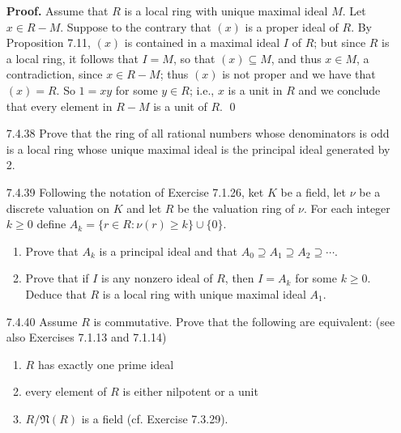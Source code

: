 \begin{enumerate}
      \textbf{Proof.} Assume that $R$ is a local ring with unique maximal ideal
      $M$. Let $x \in R - M$. Suppose to the contrary that $(x)$ is a proper
      ideal of $R$. By Proposition 7.11, $(x)$ is contained in a maximal ideal
      $I$ of $R$; but since $R$ is a local ring, it follows that $I = M$, so
      that $(x) \subseteq M$, and thus $x \in M$, a contradiction, since
      $x \in R - M$; thus $(x)$ is not proper and we have that $(x) = R$. So
      $1 = xy$ for some $y \in R$; i.e., $x$ is a unit in $R$ and we conclude
      that every element in $R - M$ is a unit of $R$. \qed
   \item[7.4.38]  Prove that the ring of all rational numbers whose denominators
                  is odd is a local ring whose unique maximal ideal is the
                  principal ideal generated by 2.
   \item[7.4.39]  Following the notation of Exercise 7.1.26, ket $K$ be a field,
                  let $\nu$ be a discrete valuation on $K$ and let $R$ be the
                  valuation ring of $\nu$. For each integer $k \ge 0$ define
                  $A_k = \{r \in R : \nu(r) \ge k\} \cup \{0\}$.
                  \begin{enumerate}
                     \item Prove that $A_k$ is a principal ideal and that
                           $A_0 \supseteq A_1 \supseteq A_2 \supseteq \cdots$.
                     \item Prove that if $I$ is any nonzero ideal of $R$, then
                           $I = A_k$ for some $k \ge 0$. Deduce that $R$ is a
                           local ring with unique maximal ideal $A_1$.
                  \end{enumerate}
   \item[7.4.40]  Assume $R$ is commutative. Prove that the following are
                  equivalent: (see also Exercises 7.1.13 and 7.1.14)
                  \begin{enumerate}\renewcommand{\labelenumii}{(\roman{enumii})}
                     \item $R$ has exactly one prime ideal
                     \item every element of $R$ is either nilpotent or a unit
                     \item $R/\mathfrak{N}(R)$ is a field (cf. Exercise 7.3.29).

\end{enumerate}
\end{enumerate}
